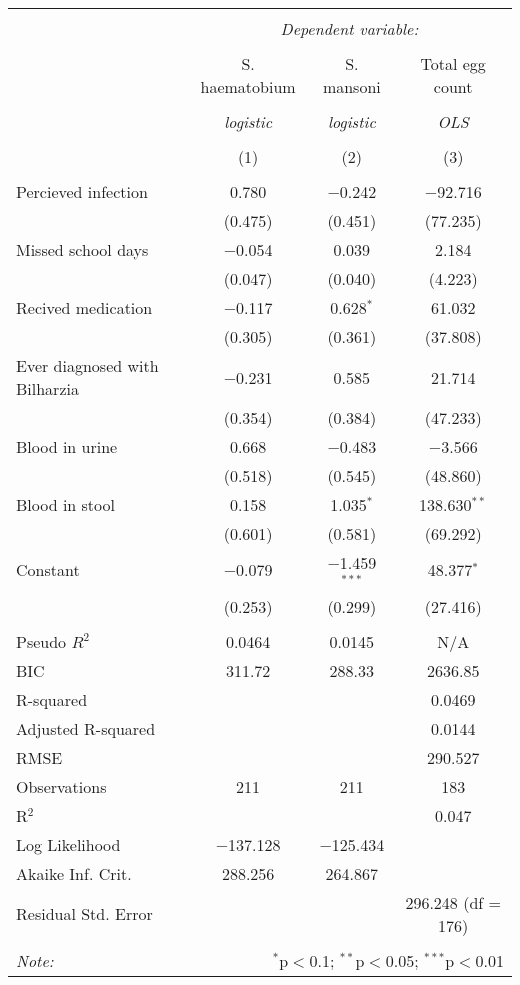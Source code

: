 
\begin{table}[!htbp] \centering 
  \caption{} 
  \label{} 
\begin{tabular}{@{\extracolsep{3pt}}lccc} 
\\[-1.8ex]\hline 
\hline \\[-1.8ex] 
 & \multicolumn{3}{c}{\textit{Dependent variable:}} \\ 
\cline{2-4} 
\\[-1.8ex] & S. haematobium & S. mansoni & Total egg count \\ 
\\[-1.8ex] & \textit{logistic} & \textit{logistic} & \textit{OLS} \\ 
\\[-1.8ex] & (1) & (2) & (3)\\ 
\hline \\[-1.8ex] 
 Percieved infection & 0.780 & $-$0.242 & $-$92.716 \\ 
  & (0.475) & (0.451) & (77.235) \\ 
  Missed school days & $-$0.054 & 0.039 & 2.184 \\ 
  & (0.047) & (0.040) & (4.223) \\ 
  Recived medication & $-$0.117 & 0.628$^{*}$ & 61.032 \\ 
  & (0.305) & (0.361) & (37.808) \\ 
  Ever diagnosed with Bilharzia & $-$0.231 & 0.585 & 21.714 \\ 
  & (0.354) & (0.384) & (47.233) \\ 
  Blood in urine & 0.668 & $-$0.483 & $-$3.566 \\ 
  & (0.518) & (0.545) & (48.860) \\ 
  Blood in stool & 0.158 & 1.035$^{*}$ & 138.630$^{**}$ \\ 
  & (0.601) & (0.581) & (69.292) \\ 
  Constant & $-$0.079 & $-$1.459$^{***}$ & 48.377$^{*}$ \\ 
  & (0.253) & (0.299) & (27.416) \\ 
 \hline \\[-1.8ex] 
Pseudo $R^2$ & 0.0464 & 0.0145 & N/A \\ 
BIC & 311.72 & 288.33 & 2636.85 \\ 
R-squared &  &  & 0.0469 \\ 
Adjusted R-squared &  &  & 0.0144 \\ 
RMSE &  &  & 290.527 \\ 
Observations & 211 & 211 & 183 \\ 
R$^{2}$ &  &  & 0.047 \\ 
Log Likelihood & $-$137.128 & $-$125.434 &  \\ 
Akaike Inf. Crit. & 288.256 & 264.867 &  \\ 
Residual Std. Error &  &  & 296.248 (df = 176) \\ 
\hline 
\hline \\[-1.8ex] 
\textit{Note:}  & \multicolumn{3}{r}{$^{*}$p$<$0.1; $^{**}$p$<$0.05; $^{***}$p$<$0.01} \\ 
\end{tabular} 
\end{table} 
